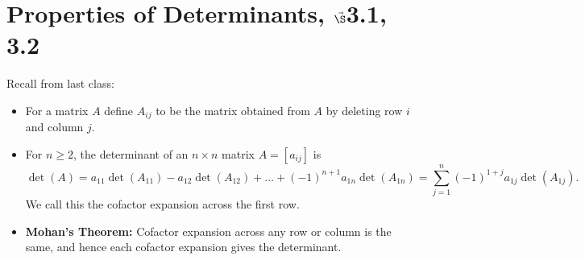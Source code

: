 


%


\section{{Properties of Determinants, $\vec\S$3.1, 3.2}}%
% 

%
\thispagestyle{fancy}

Recall from last class:

\begin{itemize}
\item For a matrix $A$ define  $A_{ij}$ to be the matrix obtained from $A$ by deleting row $i$ and column $j$.
\item For $n\geq 2$, the determinant of an $n\times n$ matrix $A=[a_{ij}]$ is
\begin{equation*}
\operatorname{det}(A)= a_{11} \operatorname{det}(A_{11}) - a_{12} \operatorname{det}(A_{12})+\dots + (-1)^{n+1} a_{1n} \operatorname{det}(A_{1n})=\sum_{j=1}^{n}(-1)^{1+j}a_{1j} \operatorname{det}(A_{1j}).
\end{equation*} We call this the cofactor expansion across the first row.
\item {\bf Mohan's Theorem:} Cofactor expansion across any row or column is the same, and hence each cofactor expansion gives the determinant.
\end{itemize}

\newpage




